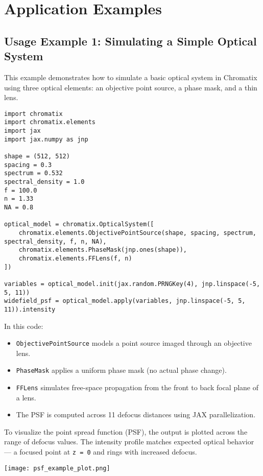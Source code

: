 \documentclass[a4paper,12pt]{report}
\begin{document}
\chapter{Application Examples}

\section{Usage Example 1: Simulating a Simple Optical System}

This example demonstrates how to simulate a basic optical system in Chromatix using three optical elements: an objective point source, a phase mask, and a thin lens.

\begin{verbatim}
import chromatix
import chromatix.elements
import jax
import jax.numpy as jnp

shape = (512, 512)
spacing = 0.3
spectrum = 0.532
spectral_density = 1.0
f = 100.0
n = 1.33
NA = 0.8

optical_model = chromatix.OpticalSystem([
    chromatix.elements.ObjectivePointSource(shape, spacing, spectrum, spectral_density, f, n, NA),
    chromatix.elements.PhaseMask(jnp.ones(shape)),
    chromatix.elements.FFLens(f, n)
])

variables = optical_model.init(jax.random.PRNGKey(4), jnp.linspace(-5, 5, 11))
widefield_psf = optical_model.apply(variables, jnp.linspace(-5, 5, 11)).intensity
\end{verbatim}

In this code:
\begin{itemize}
    \item \texttt{ObjectivePointSource} models a point source imaged through an objective lens.
    \item \texttt{PhaseMask} applies a uniform phase mask (no actual phase change).
    \item \texttt{FFLens} simulates free-space propagation from the front to back focal plane of a lens.
    \item The PSF is computed across 11 defocus distances using JAX parallelization.
\end{itemize}

To visualize the point spread function (PSF), the output is plotted across the range of defocus values. The intensity profile matches expected optical behavior — a focused point at \texttt{z = 0} and rings with increased defocus.

\begin{center}
\texttt{[image: psf\_example\_plot.png]}
\end{center}
\end{document}
